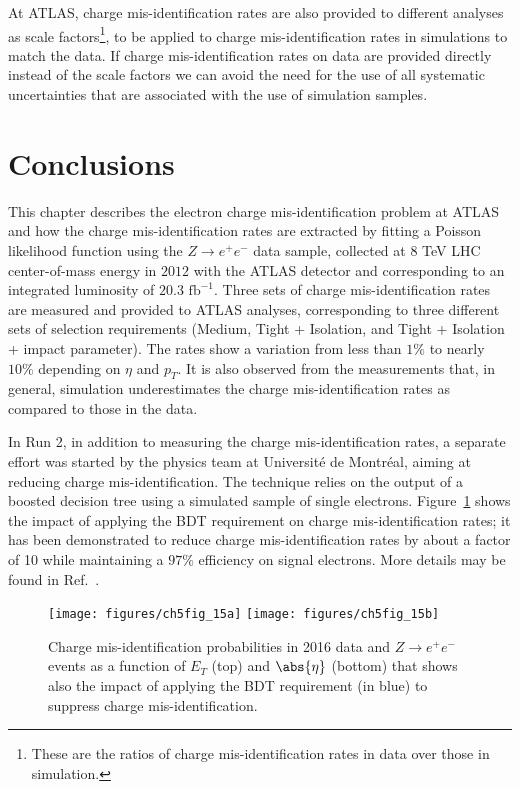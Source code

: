 At ATLAS, charge mis-identification rates are also provided to different
analyses as scale factors\footnote{These are the ratios of charge
mis-identification rates in data over those in simulation.}, to be applied to
charge mis-identification rates in simulations to match the data. If charge
mis-identification rates on data are provided directly instead of the scale
factors we can avoid the need for the use of all systematic uncertainties that
are associated with the use of simulation samples.


\section{Conclusions}\label{s:chargecon}

This chapter describes the electron charge mis-identification problem at ATLAS
and how the charge mis-identification rates are extracted by fitting a Poisson
likelihood function using the $Z\to e^+e^-$ data sample, collected at $8$ TeV
LHC center-of-mass energy in $2012$ with the ATLAS detector and corresponding
to an integrated luminosity of $20.3$ $\text{fb}^{-1}$. Three sets of charge
mis-identification rates are measured and provided to ATLAS analyses,
corresponding to three different sets of selection requirements (Medium, Tight
+ Isolation, and Tight + Isolation + impact parameter). The rates show a
variation from less than $1\%$ to nearly $10\%$ depending on $\eta$ and $p_T$.
It is also observed from the measurements that, in general, simulation
underestimates the charge mis-identification rates as compared to those in the
data.

In Run 2, in addition to measuring the charge mis-identification rates, a
separate effort was started by the physics team at Universit\'{e} de
Montr\'{e}al, aiming at reducing charge mis-identification. The technique
relies on the output of a boosted decision tree using a simulated sample of
single electrons. Figure~\ref{f:meeratesbdt} shows the impact of applying the
BDT requirement on charge mis-identification rates; it has been demonstrated to
reduce charge mis-identification rates by about a factor of 10 while
maintaining a $97\%$ efficiency on signal electrons. More details may be found
in Ref.~\cite{atlaselcid}.

\begin{figure}[H]
	\texttt{[image: figures/ch5fig\_15a]}
	\texttt{[image: figures/ch5fig\_15b]}
	\centering

	\caption{Charge mis-identification probabilities in 2016 data and $Z\to e^+e^-$
		events as a function of $E_T$ (top) and $\abs{\eta}$ (bottom) that shows also
		the impact of applying the BDT requirement (in blue) to suppress charge mis-identification.
	}

	\label{f:meeratesbdt}
\end{figure}
